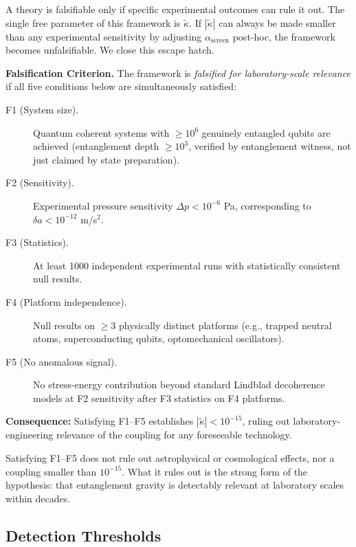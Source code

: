 \documentclass[12pt,letterpaper]{article}
\theoremstyle{plain}
\theoremstyle{definition}
\theoremstyle{remark}
\newcommand{\ascreen}{\alpha_{\mathrm{screen}}}
\begin{document}
A theory is falsifiable only if specific experimental outcomes can rule
it out. The single free parameter of this framework is $\tilde{\kappa}$.
If $|\tilde{\kappa}|$ can always be made smaller than any experimental
sensitivity by adjusting $\ascreen$ post-hoc, the framework becomes
unfalsifiable. We close this escape hatch.

\begin{corestatement}
\textbf{Falsification Criterion.} The framework is \emph{falsified for
laboratory-scale relevance} if all five conditions below are simultaneously
satisfied:

\begin{description}
  \item[F1 (System size).] Quantum coherent systems with $\geq 10^6$
    genuinely entangled qubits are achieved (entanglement depth
    $\geq 10^3$, verified by entanglement witness, not just claimed
    by state preparation).
  \item[F2 (Sensitivity).] Experimental pressure sensitivity
    $\Delta p < 10^{-6}$ Pa, corresponding to $\delta a < 10^{-12}$
    m/s$^2$.
  \item[F3 (Statistics).] At least 1000 independent experimental runs
    with statistically consistent null results.
  \item[F4 (Platform independence).] Null results on $\geq 3$
    physically distinct platforms (e.g., trapped neutral atoms,
    superconducting qubits, optomechanical oscillators).
  \item[F5 (No anomalous signal).] No stress-energy contribution
    beyond standard Lindblad decoherence models at F2 sensitivity
    after F3 statistics on F4 platforms.
\end{description}

\medskip
\noindent\textbf{Consequence:} Satisfying F1--F5 establishes
$|\tilde{\kappa}| < 10^{-15}$, ruling out laboratory-engineering
relevance of the coupling for any foreseeable technology.
\end{corestatement}

Satisfying F1--F5 does not rule out astrophysical or cosmological effects,
nor a coupling smaller than $10^{-15}$. What it rules out is the
strong form of the hypothesis: that entanglement gravity is detectably
relevant at laboratory scales within decades.

\subsection{Detection Thresholds}
\end{document}
